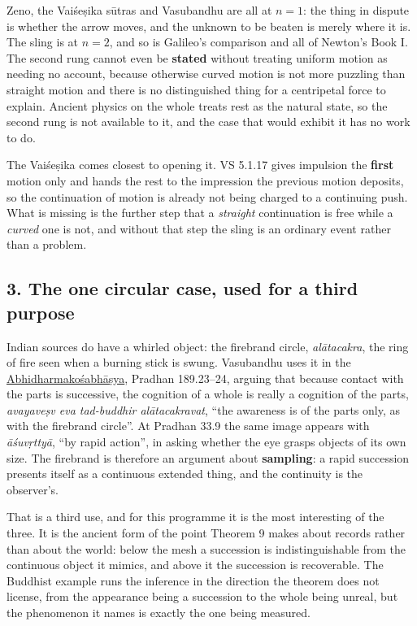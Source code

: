 \documentclass[11pt,a4paper]{article}
\begin{document}
Zeno, the Vaiśeṣika sūtras and Vasubandhu are all at \(n=1\): the thing
in dispute is whether the arrow moves, and the unknown to be beaten is
merely where it is. The sling is at \(n=2\), and so is Galileo's
comparison and all of Newton's Book I. The second rung cannot even be
\textbf{stated} without treating uniform motion as needing no account,
because otherwise curved motion is not more puzzling than straight
motion and there is no distinguished thing for a centripetal force to
explain. Ancient physics on the whole treats rest as the natural state,
so the second rung is not available to it, and the case that would
exhibit it has no work to do.

The Vaiśeṣika comes closest to opening it. VS 5.1.17 gives impulsion the
\textbf{first} motion only and hands the rest to the impression the
previous motion deposits, so the continuation of motion is already not
being charged to a continuing push. What is missing is the further step
that a \emph{straight} continuation is free while a \emph{curved} one is
not, and without that step the sling is an ordinary event rather than a
problem.

\hypertarget{the-one-circular-case-used-for-a-third-purpose}{%
\subsection{3. The one circular case, used for a third
purpose}\label{the-one-circular-case-used-for-a-third-purpose}}

Indian sources do have a whirled object: the firebrand circle,
\emph{alātacakra}, the ring of fire seen when a burning stick is swung.
Vasubandhu uses it in the
\href{../docs/classics/Abhidharmakosabhasya_motion_atoms_GRETIL.md}{Abhidharmakośabhāṣya},
Pradhan 189.23--24, arguing that because contact with the parts is
successive, the cognition of a whole is really a cognition of the parts,
\emph{avayaveṣv eva tad-buddhir alātacakravat}, ``the awareness is of
the parts only, as with the firebrand circle''. At Pradhan 33.9 the same
image appears with \emph{āśuvṛttyā}, ``by rapid action'', in asking
whether the eye grasps objects of its own size. The firebrand is
therefore an argument about \textbf{sampling}: a rapid succession
presents itself as a continuous extended thing, and the continuity is
the observer's.

That is a third use, and for this programme it is the most interesting
of the three. It is the ancient form of the point Theorem 9 makes about
records rather than about the world: below the mesh a succession is
indistinguishable from the continuous object it mimics, and above it the
succession is recoverable. The Buddhist example runs the inference in
the direction the theorem does not license, from the appearance being a
succession to the whole being unreal, but the phenomenon it names is
exactly the one being measured.
\end{document}

